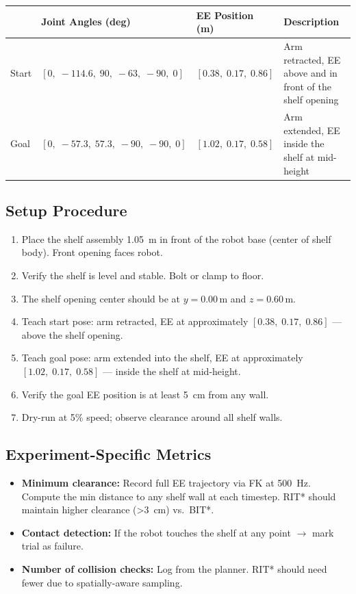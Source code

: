 \documentclass[11pt]{article}
\begin{document}
\begin{table}[h]
\centering
\begin{tabular}{@{}lllp{5.5cm}@{}}
\toprule
 & Joint Angles (deg) & EE Position (m) & Description \\
\midrule
Start & $[0,\; -114.6,\; 90,\; -63,\; -90,\; 0]$
      & $[0.38,\; 0.17,\; 0.86]$
      & Arm retracted, EE above and in front of the shelf opening \\[4pt]
Goal  & $[0,\; -57.3,\; 57.3,\; -90,\; -90,\; 0]$
      & $[1.02,\; 0.17,\; 0.58]$
      & Arm extended, EE inside the shelf at mid-height \\
\bottomrule
\end{tabular}
\end{table}

\subsection{Setup Procedure}

\begin{enumerate}[itemsep=2pt]
  \item Place the shelf assembly \SI{1.05}{\meter} in front of the robot base (center of shelf body). Front opening faces robot.
  \item Verify the shelf is level and stable. Bolt or clamp to floor.
  \item The shelf opening center should be at $y = 0.00$\,m and $z = 0.60$\,m.
  \item Teach start pose: arm retracted, EE at approximately $[0.38,\; 0.17,\; 0.86]$ --- above the shelf opening.
  \item Teach goal pose: arm extended into the shelf, EE at approximately $[1.02,\; 0.17,\; 0.58]$ --- inside the shelf at mid-height.
  \item Verify the goal EE position is at least \SI{5}{\centi\meter} from any wall.
  \item Dry-run at 5\% speed; observe clearance around all shelf walls.
\end{enumerate}

\subsection{Experiment-Specific Metrics}
\begin{itemize}[itemsep=2pt]
  \item \textbf{Minimum clearance:} Record full EE trajectory via FK at \SI{500}{\hertz}. Compute the min distance to any shelf wall at each timestep. RIT* should maintain higher clearance (\SI{>3}{\centi\meter}) vs.\ BIT*.
  \item \textbf{Contact detection:} If the robot touches the shelf at any point $\rightarrow$ mark trial as failure.
  \item \textbf{Number of collision checks:} Log from the planner. RIT* should need fewer due to spatially-aware sampling.
\end{itemize}
\end{document}
